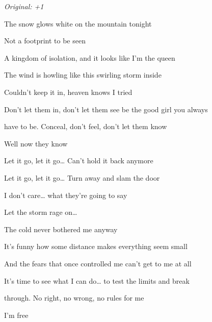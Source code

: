 \begin{song}


\begin{headerbox}
\textit{Original: +1}
\end{headerbox}

\begin{hchordbox}
\end{hchordbox}

\large

\bigskip

The snow glows white on the mountain tonight \par
Not a footprint to be seen  \par
A kingdom of isolation, and it looks like I'm the queen  \par
{} The wind is howling like this swirling storm inside \par
{} Couldn't keep it in, heaven knows I tried  \par

\bigskip

 Don't let them in, don't let them see be the good girl you always\par
have to be. Conceal, don't feel, don't let them know \par
Well now they know  \par

\bigskip

Let it go, let it go… Can't hold it back anymore \par
Let it go, let it go… Turn away and slam the door \par
{}I don't care… what they're going to say \par
Let the storm rage on… \par
The cold never bothered me anyway \par

\bigskip

  \par
It's funny how some distance makes everything seem small \par
And the fears that once controlled me can't get to me at all \par
{} It's time to see what I can do… to test the limits and break \par
{}through. No right, no wrong, no rules for me \par
I'm free  \par


\end{song}
